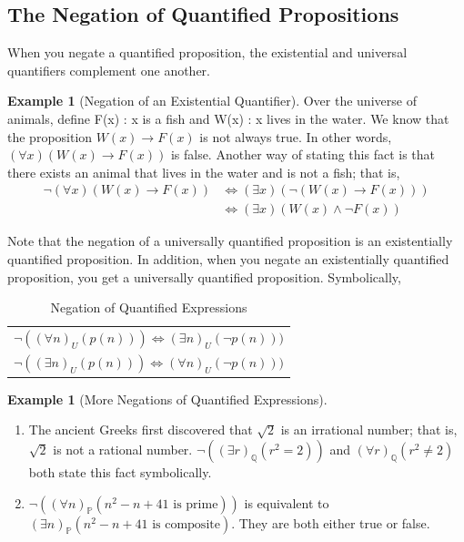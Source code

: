 \documentclass[10pt,]{book}
\theoremstyle{plain}
\theoremstyle{definition}
\theoremstyle{definition}
\theoremstyle{definition}
\newtheorem{example}[theorem]{Example}
\theoremstyle{definition}
\begin{document}
\subsection[The Negation of Quantified Propositions]{The Negation of Quantified Propositions}\label{ss-negated-quantifiers}
When you negate a quantified proposition, the existential and universal quantifiers complement one another.
%
\begin{example}[Negation of an Existential Quantifier]\label{ex-negated-existential}
 Over the universe of animals, define F(x) : x is a fish and W(x) : x lives in the water. We know that the proposition \(W(x) \rightarrow
 F(x)\) is not always true. In other words, \((\forall x)(W(x) \rightarrow  F(x))\) is false. Another way of stating this fact is that there exists an animal that lives in the water and is not a fish; that is,
\begin{equation*}\begin{split}
\neg (\forall x)(W(x) \to  F(x)) & \Leftrightarrow (\exists  x)(\neg (W(x) \rightarrow  F(x))) \\
		&  \Leftrightarrow (\exists  x)(W(x) \land  \neg F(x))
\end{split}
\end{equation*}%
\end{example}
\par
Note that the negation of a universally quantified proposition is an existentially quantified proposition. In addition, when you negate an existentially quantified proposition, you get a universally quantified proposition.   Symbolically,
%
\leavevmode%
\begin{table}
\centering
\begin{tabular}{c}
\(\neg ((\forall n)_U(p(n)) )\Leftrightarrow  (\exists  n) _U (\neg p(n)))\)\tabularnewline[0pt]
\(\neg ((\exists n)_U(p(n)) )\Leftrightarrow  (\forall  n) _U (\neg p(n)))\)
\end{tabular}
\caption{Negation of Quantified Expressions\label{table-quantifier-negation}}
\end{table}
\begin{example}[More Negations of Quantified Expressions]\label{ex-more-negated-quantifiers}
\leavevmode%
\begin{enumerate}[label=\alph*]
\item\hypertarget{li-290}{}  The ancient Greeks first discovered that \(\sqrt{2}\) is an irrational number; that is, \(\sqrt{2}\) is not a rational number. \(\neg ((\exists r)_{\mathbb{Q}}(r^2 = 2))\) and \((\forall r)_{\mathbb{Q}} (r^2\neq  2)\) both state this fact symbolically.
%
\item\hypertarget{li-291}{} \(\neg ((\forall n)_{\mathbb{P}}(n ^2- n + 41 \textrm{ is prime}))\) is equivalent to \((\exists  n)_{\mathbb{P}} (n^2
- n + 41 \textrm{ is composite})\). They are both either true or false.
%
\end{enumerate}
%
\end{example}
\typeout{************************************************}
\typeout{************************************************}
\end{document}
